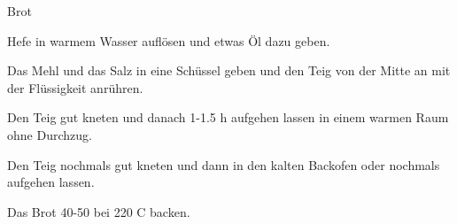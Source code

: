 
\begin{recipe}[]{Brot}{}{}



\step
Hefe in warmem Wasser aufl\"osen und etwas \"Ol dazu geben.

\step
Das Mehl und das Salz in eine Sch\"ussel geben und den Teig von der Mitte an mit der Fl\"ussigkeit anr\"uhren.

\step
Den Teig gut kneten und danach 1-1.5 h aufgehen lassen in einem warmen Raum ohne Durchzug.

\step
Den Teig nochmals gut kneten und dann in den kalten Backofen oder nochmals aufgehen lassen.

\step
Das Brot 40-50 \min bei 220 C backen.


\end{recipe}